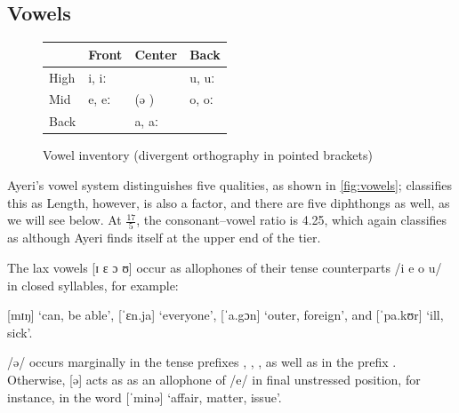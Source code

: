 %
%

\subsection{Vowels}

%
\begin{figure}[ht]\centering
\caption[Vowel inventory]{Vowel inventory (divergent orthography in pointed brackets)}
\begin{tabu} to .67\linewidth{H[1] X[2c] X[2c] X[2c]}
\toprule\tableheaderfont

	& Front
	& Center
	& Back
	\\

\toprule

High
	& i, iː 
	&
	& u, uː 
	\\

Mid
	& e, eː 
	& (ə )
	& o, oː 
	\\

Back
	&
	& a, aː 
	&
	\\

\bottomrule
\end{tabu}
\label{fig:vowels}
\end{figure}

Ayeri's vowel system distinguishes five qualities, as shown in 
\autoref{fig:vowels}; \citet{wals2} classifies this as 
Length, however, is also a factor, and there are five diphthongs as well, as we 
will see below. At $\frac{17}{5}$, the consonant--vowel ratio is 4.25, which 
\citet{wals3} again classifies as  although Ayeri finds 
itself at the upper end of the tier.

%
The lax vowels [ɪ ɛ ɔ ʊ] occur as allophones of their tense counterparts 
/i e o u/ in closed syllables, for example:

\pex
	\a {} [mɪŋ] `can, be able',
	\a {} [ˈɛn.ja] `everyone',
	\a {} [ˈa.gɔn] `outer, foreign', and
	\a {} [ˈpa.kʊr] `ill, sick'.
\xe

/ə/ occurs marginally in the tense prefixes , 
, , as well as in the prefix 
. Otherwise, [ə] acts as as an allophone of /e/ 
in final unstressed position, for instance, in the word 
 [ˈminə] `affair, matter, issue'.

